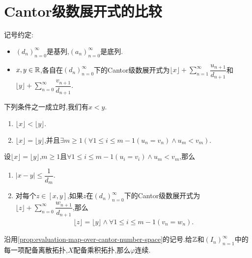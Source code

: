 \section{Cantor级数展开式的比较}

记号约定:
\begin{itemize}
	\item $\left(d_{n}\right)_{n=0}^{\infty}$是基列,$\left(a_{n}\right)_{n=0}^{\infty}$是底列.
	\item $x,y\in\mathbb{R}$,各自在$\left(d_{n}\right)_{n=0}^{\infty}$下的Cantor级数展开式为$\lfloor x\rfloor+\sum\limits_{n=1}^{\infty}\dfrac{u_{n+1}}{d_{n+1}}$和$\lfloor y\rfloor+\sum\limits_{n=0}^{\infty}\dfrac{v_{n+1}}{d_{n+1}}$.
\end{itemize}

\begin{proposition}{}{}
	下列条件之一成立时,我们有$x<y$.
	\begin{enumerate}
		\item $\lfloor x\rfloor<\lfloor y\rfloor$.
		\item $\lfloor x\rfloor=\lfloor y\rfloor$,并且$\exists m\geq 1\left(\forall 1\leq i\leq m-1\left(u_{n}=v_{n}\right)\wedge u_{m}<v_{m}\right)$.
	\end{enumerate}
\end{proposition}

\begin{proposition}{}{}
	设$\lfloor x\rfloor=\lfloor y\rfloor$,$m\geq 1$且$\forall 1\leq i\leq m-1\left(u_{i}=v_{i}\right)\wedge u_{m}<v_{m}$,那么
	\begin{enumerate}
		\item $\left|x-y\right|\leq\dfrac{1}{d_{m}}$.
		\item 对每个$z\in\left[x,y\right]$,如果$z$在$\left(d_{n}\right)_{n=0}^{\infty}$下的Cantor级数展开式为$\lfloor z\rfloor+\sum\limits_{n=0}^{\infty}\dfrac{w_{n+1}}{d_{n+1}}$,那么
		\begin{align*}
			\lfloor z\rfloor=\lfloor y\rfloor\wedge\forall 1\leq i\leq m-1\left(v_{n}=w_{n}\right).
		\end{align*}
	\end{enumerate}
\end{proposition}

\begin{corollary}{}{}
	沿用\cref{prop:evaluation-map-over-cantor-number-space}的记号.给$\mathbb{Z}$和$\left(I_{n}\right)_{n=1}^{\infty}$中的每一项配备离散拓扑,$X$配备乘积拓扑,那么$\varphi$连续.
\end{corollary}